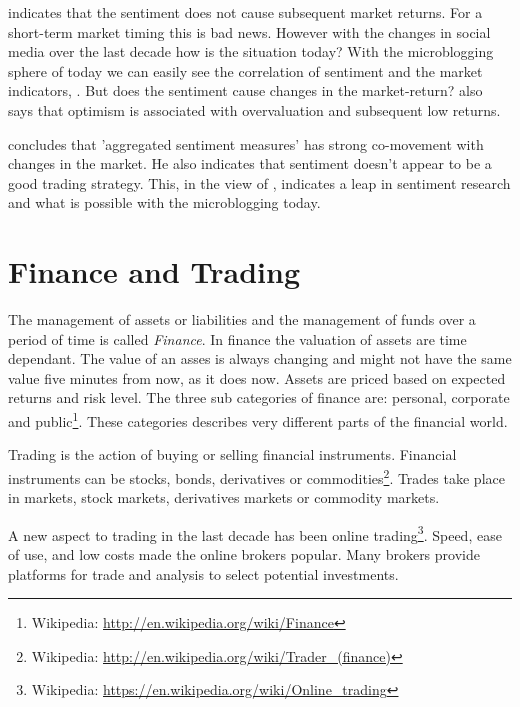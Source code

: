 \cite[p3]{Brown20041} indicates that the sentiment does not cause subsequent
market returns. For a short-term market timing this is bad news. However
with the changes in social media over the last decade how is the situation
today? With the microblogging sphere of today we can easily see the
correlation of sentiment and the market indicators,
\cite[]{annikajubbega11:twitter_driver_stock_price}. But
does the sentiment cause changes in the market-return?
\cite[p3]{Brown20041} also says that optimism is associated with overvaluation
and subsequent low returns.

\cite[p]{Brown20041} concludes that 'aggregated sentiment measures' has strong
co-movement with changes in the market. He also indicates that sentiment
doesn't appear to be a good trading strategy. This, in the view of
\cite[]{Zhang201155}, indicates a leap in sentiment research and what is possible
with the microblogging today.

\section{Finance and Trading}\label{previous_work:finance}

The management of assets or liabilities and the management of funds over a
period of time is called \textit{Finance}. In finance the valuation of assets are time
dependant. The value of an asses is always changing and might not have the same
value five minutes from now, as it does now. Assets are priced based on expected returns and
risk level. The three sub categories of finance are: personal, corporate and
public\footnote{Wikipedia: \url{http://en.wikipedia.org/wiki/Finance}}. These
categories describes very different parts of the financial world.  

Trading is the action of buying or selling financial instruments.
Financial instruments can be stocks, bonds, derivatives or
commodities\footnote{Wikipedia: \url{http://en.wikipedia.org/wiki/Trader_(finance)}}.
Trades take place in markets, stock markets, derivatives markets or commodity
markets.

A new aspect to trading in the last decade has been online trading\footnote{Wikipedia: \url{https://en.wikipedia.org/wiki/Online_trading}}.
Speed, ease of use, and low costs made the online brokers popular. Many brokers
provide platforms for trade and analysis to select potential investments.  

